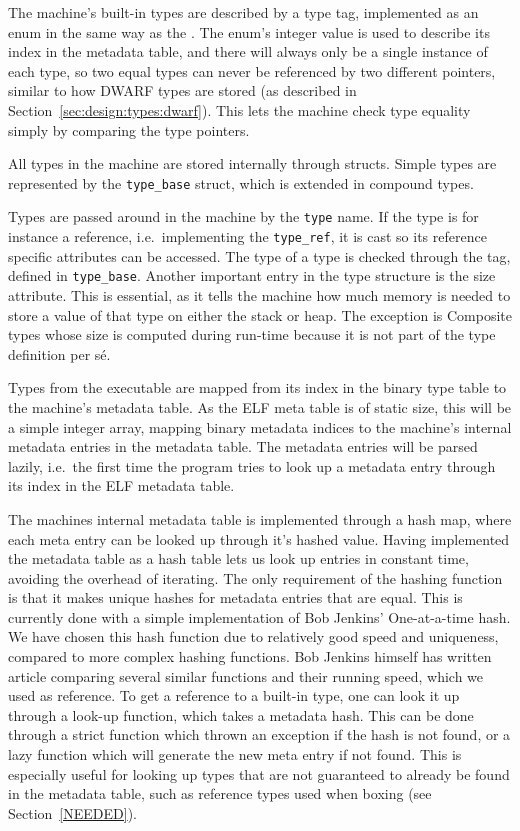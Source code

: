 The machine's built-in types are described by a type tag, implemented as an enum
in the same way as the . The enum's integer value is used to
describe its index in the metadata table, and there will always only be a single
instance of each type, so two equal types can never be referenced by two
different pointers, similar to how DWARF types are stored (as described in
Section~\ref{sec:design:types:dwarf}). This lets the machine check type equality
simply by comparing the type pointers.

All types in the machine are stored internally through structs. Simple types are
represented by the {\tt type\_base} struct, which is extended in compound
types.

Types are passed around in the machine by the {\tt type} name. If the type is
for instance a reference, i.e.~implementing the {\tt type\_ref}, it is cast so
its reference specific attributes can be accessed. The type of a type is checked
through the tag, defined in {\tt type\_base}. Another important entry in the
type structure is the size attribute. This is essential, as it tells the machine
how much memory is needed to store a value of that type on either the stack or
heap. The exception is Composite types whose size is computed during run-time
because it is not part of the type definition per s\'e.

Types from the executable are mapped from its index in the binary type table to
the machine's metadata table. As the ELF meta table is of static size, this will
be a simple integer array, mapping binary metadata indices to the machine's
internal metadata entries in the metadata table. The metadata entries will be
parsed lazily, i.e.~the first time the program tries to look up a metadata entry
through its index in the ELF metadata table.

The machines internal metadata table is implemented through a hash map, where
each meta entry can be looked up through it's hashed value. Having implemented
the metadata table as a hash table lets us look up entries in constant time,
avoiding the overhead of iterating. The only requirement of the hashing function
is that it makes unique hashes for metadata entries that are equal. This is
currently done with a simple implementation of Bob Jenkins' One-at-a-time
hash\cite{jenkins}. We have chosen this hash function due to relatively good
speed and uniqueness, compared to more complex hashing functions. Bob Jenkins
himself has written article comparing several similar functions and their
running speed, which we used as reference\cite{jenkins}. To get a reference to a
built-in type, one can look it up through a look-up function, which takes a
metadata hash. This can be done through a strict function which thrown an
exception if the hash is not found, or a lazy function which will generate the
new meta entry if not found. This is especially useful for looking up types that
are not guaranteed to already be found in the metadata table, such as reference
types used when boxing (see Section~\ref{NEEDED}).


